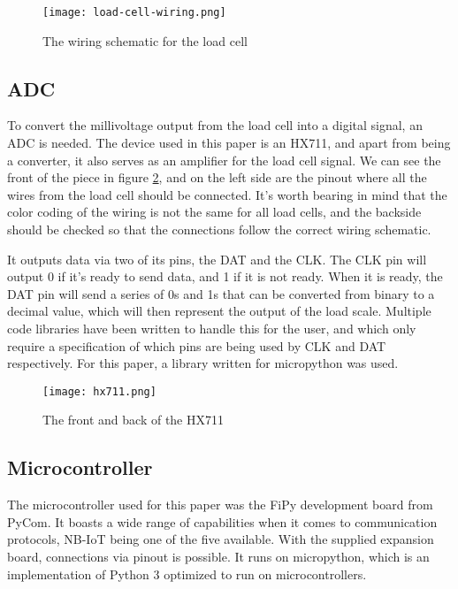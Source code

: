 \begin{figure}[h]
	\centering
	\texttt{[image: load-cell-wiring.png]}
	\caption{The wiring schematic for the load cell}
	\label{fig:wiring}
\end{figure}


\subsection{ADC}
To convert the millivoltage output from the load cell into a digital signal, an ADC is needed. The device used in this paper is an HX711, and apart from being a converter, it also serves as an amplifier for the load cell signal. We can see the front of the piece in figure \ref{fig:hx711}, and on the left side are the pinout where all the wires from the load cell should be connected. It's worth bearing in mind that the color coding of the wiring is not the same for all load cells, and the backside should be checked so that the connections follow the correct wiring schematic. 

It outputs data via two of its pins, the DAT and the CLK. The CLK pin will output 0 if it's ready to send data, and 1 if it is not ready. When it is ready, the DAT pin will send  a series of 0s and 1s that can be converted from binary to a decimal value, which will then represent the output of the load scale.\cite{hx711-datasheet} Multiple code libraries have been written to handle this for the user, and which only require a specification of which pins are being used by CLK and DAT respectively. For this paper, a library written for micropython was used.\cite{hx711-lopy}

\begin{figure}[h]
	\centering
	\texttt{[image: hx711.png]}
	\caption{The front and back of the HX711}
	\label{fig:hx711}
\end{figure}


\subsection{Microcontroller}
The microcontroller used for this paper was the FiPy development board from PyCom. It boasts a wide range of capabilities when it comes to communication protocols, NB-IoT being one of the five available.\cite{fipy-docs} With the supplied expansion board, connections via pinout is possible. It runs on micropython, which is an implementation of Python 3 optimized to run on microcontrollers.\cite{micropython}

